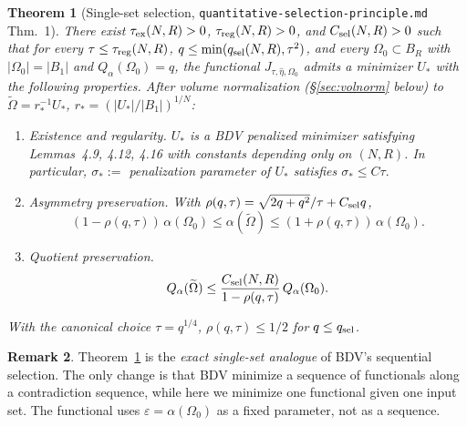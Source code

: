 \documentclass[11pt]{amsart}
\newtheorem{theorem}{Theorem}[section]
\theoremstyle{definition}
\newtheorem{remark}[theorem]{Remark}
\newcommand{\abs}[1]{\left|#1\right|}
\begin{document}
\begin{theorem}[Single-set selection, \texttt{quantitative-selection-principle.md} Thm.~1]\label{thm:selection}
There exist $\tau_{\rm ex}(N,R)>0$, $\tau_{\rm reg}(N,R)>0$, and
$C_{\rm sel}(N,R)>0$ such that for every $\tau\le\tau_{\rm reg}(N,R)$,
$q\le\min(q_{\rm sel}(N,R),\tau^2)$, and every $\Omega_0\subset B_R$ with
$\abs{\Omega_0}=\abs{B_1}$ and $Q_\alpha(\Omega_0)=q$, the functional
$J_{\tau,\hat\eta,\Omega_0}$ admits a minimizer $U_*$ with the following
properties. After volume normalization (\S\ref{sec:volnorm} below) to
$\widetilde\Omega=r_*^{-1}U_*$, $r_*=(\abs{U_*}/\abs{B_1})^{1/N}$:
\begin{enumerate}
\item \emph{Existence and regularity.} $U_*$ is a BDV penalized minimizer
satisfying Lemmas~4.9, 4.12, 4.16 with constants depending only on
$(N,R)$. In particular, $\sigma_*:=$ penalization parameter of $U_*$
satisfies
\(
\sigma_*\le C\tau.
\)
\item \emph{Asymmetry preservation.} With
$\rho(q,\tau)=\sqrt{2q+q^2}/\tau+C_{\rm sel}q$,
\[
(1-\rho(q,\tau))\,\alpha(\Omega_0)
\le \alpha(\widetilde\Omega)
\le (1+\rho(q,\tau))\,\alpha(\Omega_0).
\]
\item \emph{Quotient preservation.}
\[
Q_\alpha(\widetilde\Omega)\le\frac{C_{\rm sel}(N,R)}{1-\rho(q,\tau)}\,Q_\alpha(\Omega_0).
\]
\end{enumerate}
With the canonical choice $\tau=q^{1/4}$, $\rho(q,\tau)\le1/2$ for
$q\le q_{\rm sel}$.
\end{theorem}

\begin{remark}
Theorem~\ref{thm:selection} is the \emph{exact single-set analogue} of BDV's
sequential selection. The only change is that BDV minimize a sequence of
functionals along a contradiction sequence, while here we minimize one
functional given one input set. The functional uses $\varepsilon=\alpha(\Omega_0)$
as a fixed parameter, not as a sequence.
\end{remark}
\end{document}
